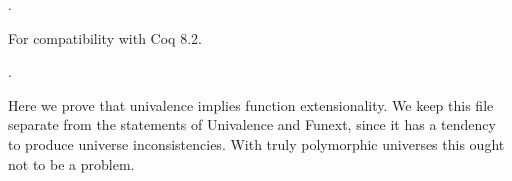 \documentclass[12pt]{report}
\begin{document}
\begin{coqdoccode}
\coqdocnoindent
{}       .\coqdoceol
\coqdocemptyline
\end{coqdoccode}
For compatibility with Coq 8.2. \begin{coqdoccode}
\coqdocnoindent
{}  .\coqdoceol
\coqdocemptyline
\end{coqdoccode}
Here we prove that univalence implies function extensionality.  We
   keep this file separate from the statements of Univalence and
   Funext, since it has a tendency to produce universe
   inconsistencies.  With truly polymorphic universes this ought not
   to be a problem.
\end{document}
